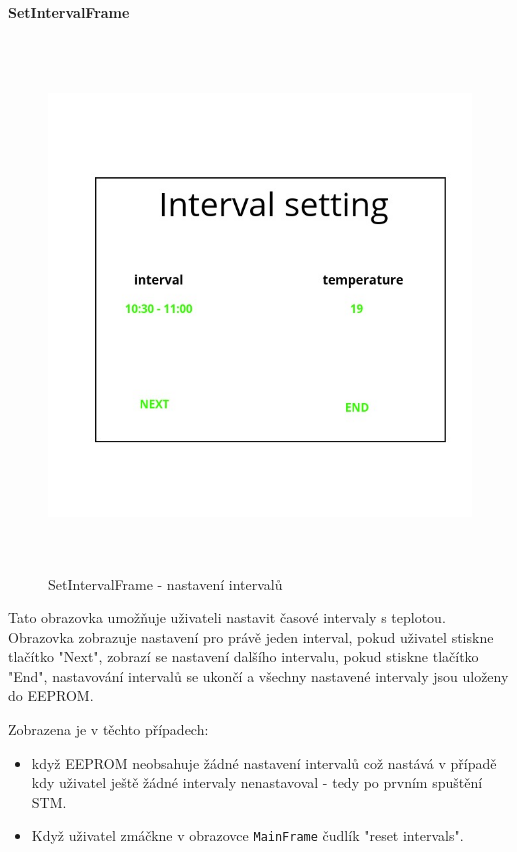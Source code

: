 \paragraph{SetIntervalFrame}
\begin{figure}[H]\centering
\includegraphics[width=140mm, height=140mm]{../img/interval_setting_frame.jpg}
\caption{SetIntervalFrame - nastavení intervalů}
\label{set-interval-frame}
\end{figure}

Tato obrazovka umožňuje uživateli nastavit časové intervaly s teplotou.
Obrazovka zobrazuje nastavení pro právě jeden interval, pokud uživatel stiskne tlačítko
"Next", zobrazí se nastavení dalšího intervalu, pokud stiskne tlačítko "End", nastavování
intervalů se ukončí a všechny nastavené intervaly jsou uloženy do EEPROM.

Zobrazena je v těchto případech:
\begin{itemize}
  \item když EEPROM neobsahuje žádné nastavení intervalů což nastává v případě kdy uživatel
    ještě žádné intervaly nenastavoval - tedy po prvním spuštění STM.
  \item Když uživatel zmáčkne v obrazovce \texttt{MainFrame} čudlík "reset intervals".
\end{itemize}

